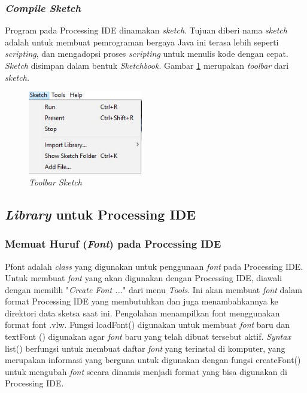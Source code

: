 \subsubsection{ \textit{Compile Sketch} }
Program pada Processing IDE dinamakan \textit{sketch}. Tujuan diberi nama \textit{sketch} adalah untuk membuat pemrograman bergaya Java ini terasa lebih seperti \textit{scripting}, dan mengadopsi proses \textit{scripting} untuk menulis kode dengan cepat. \textit{Sketch} disimpan dalam bentuk \textit{Sketchbook}. Gambar \ref{pic.toolbarsketch} merupakan \textit{toolbar} dari \textit{sketch.}

	\begin{figure}[H]
	\centering
	\includegraphics[width=5cm]{gambar/compile.jpg}
	\caption{\textit{Toolbar Sketch}}
	\label{pic.toolbarsketch}
\end{figure}

\subsection{ \textit{Library} untuk Processing IDE }
\subsubsection{ Memuat Huruf (\textit{Font}) pada Processing IDE }
Pfont adalah \textit{class} yang digunakan untuk penggunaan \textit{font} pada Processing IDE. Untuk membuat \textit{font} yang akan digunakan dengan Processing IDE, diawali dengan memilih "\textit{Create Font ...}" dari menu \textit{Tools}. Ini akan membuat \textit{font} dalam format Processing IDE yang membutuhkan dan juga menambahkannya ke direktori data sketsa saat ini. Pengolahan menampilkan font menggunakan format font .vlw. Fungsi loadFont() digunakan untuk membuat \textit{font} baru dan textFont () digunakan agar \textit{font} baru yang telah dibuat tersebut aktif. \textit{Syntax} list() berfungsi untuk membuat daftar \textit{font} yang terinstal di komputer, yang merupakan informasi yang berguna untuk digunakan dengan fungsi createFont() untuk mengubah \textit{font} secara dinamis menjadi format yang bisa digunakan di Processing IDE. 


